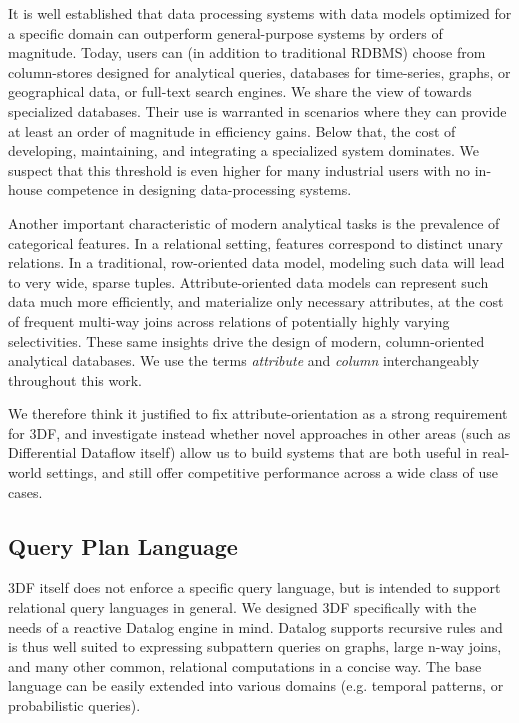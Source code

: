 \documentclass[../index.tex]{subfiles}
\begin{document}
It is well established that data processing systems with data models
optimized for a specific domain can outperform general-purpose systems
by orders of magnitude. Today, users can (in addition to traditional
RDBMS) choose from column-stores designed for analytical queries,
databases for time-series, graphs, or geographical data, or full-text
search engines. We share the view of \cite{aref2015design} towards
specialized databases. Their use is warranted in scenarios where they
can provide at least an order of magnitude in efficiency gains. Below
that, the cost of developing, maintaining, and integrating a
specialized system dominates. We suspect that this threshold is even
higher for many industrial users with no in-house competence in
designing data-processing systems.

Another important characteristic of modern analytical tasks is the
prevalence of categorical features. In a relational setting, features
correspond to distinct unary relations. In a traditional, row-oriented
data model, modeling such data will lead to very wide, sparse
tuples. Attribute-oriented data models can represent such data much
more efficiently, and materialize only necessary attributes, at the
cost of frequent multi-way joins across relations of potentially
highly varying selectivities. These same insights drive the design of
modern, column-oriented analytical databases. We use the terms
\emph{attribute} and \emph{column} interchangeably throughout this
work.

We therefore think it justified to fix attribute-orientation as a
strong requirement for 3DF, and investigate instead whether novel
approaches in other areas (such as Differential Dataflow itself) allow
us to build systems that are both useful in real-world settings, and
still offer competitive performance across a wide class of use cases.

\subsection{Query Plan Language}

3DF itself does not enforce a specific query language, but is intended
to support relational query languages in general. We designed 3DF
specifically with the needs of a reactive Datalog engine in
mind. Datalog supports recursive rules and is thus well suited to
expressing subpattern queries on graphs, large n-way joins, and many
other common, relational computations in a concise way. The base
language can be easily extended into various domains (e.g. temporal
patterns, or probabilistic queries).
\end{document}
